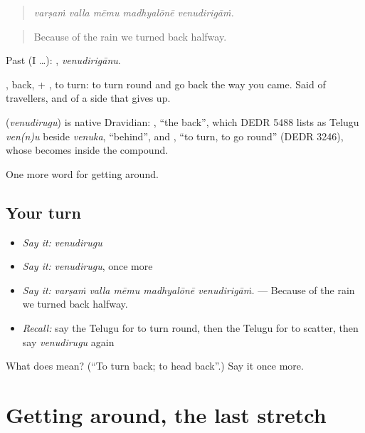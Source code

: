 \begin{quote}
\emph{varṣaṁ valla mēmu madhyalōnē venudirigāṁ.}
\end{quote}

\begin{quote}
Because of the rain we turned back halfway.
\end{quote}

Past (I …): , \emph{venudirigānu}.

, back, + , to turn: to turn round and go back the way you came. Said of travellers, and of a side that gives up.

\begin{cousinweb}
\textbf{} (\emph{venudirugu}) is native Dravidian: , \textquotedblleft{}the back\textquotedblright{}, which DEDR 5488 lists as Telugu \emph{ven(n)u} beside \emph{venuka}, \textquotedblleft{}behind\textquotedblright{}, and , \textquotedblleft{}to turn, to go round\textquotedblright{} (DEDR 3246), whose  becomes  inside the compound.
\end{cousinweb}

\begin{grammarlens}[title={What you've built}]
One more word for getting around.
\end{grammarlens}

\subsection*{Your turn}
\begin{itemize}
\raggedright
  \item \emph{Say it:} \emph{venudirugu}
  \item \emph{Say it:} \emph{venudirugu}, once more
  \item \emph{Say it:} \emph{varṣaṁ valla mēmu madhyalōnē venudirigāṁ.} — Because of the rain we turned back halfway.
  \item \emph{Recall:} say the Telugu for to turn round, then the Telugu for to scatter, then say \emph{venudirugu} again
\end{itemize}

\begin{tcolorbox}[breakable,colback=teal!4,colframe=teal!35!black,title={Before you move on}]
What does  mean? (\textquotedblleft{}To turn back; to head back\textquotedblright{}.) Say it once more.
\end{tcolorbox}
\section[(dialogue)]{Getting around, the last stretch}

